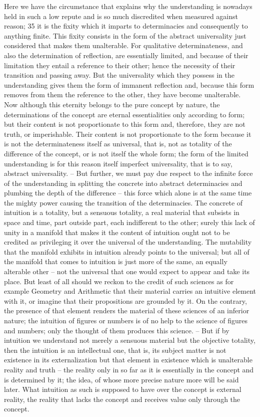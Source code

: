 Here we have the circumstance that explains why the understanding
is nowadays held in such a low repute and is so much discredited when
measured against reason; 35 it is the fixity which it imparts to determinacies
and consequently to anything finite. This fixity consists in the form of
the abstract universality just considered that makes them unalterable. For
qualitative determinateness, and also the determination of reflection, are
essentially limited, and because of their limitation they entail a reference
to their other; hence the necessity of their transition and passing away. But
the universality which they possess in the understanding gives them the
form of immanent reflection and, because this form removes from them
the reference to the other, they have become unalterable. Now although
this eternity belongs to the pure concept by nature, the determinations
of the concept are eternal essentialities only according to form; but their
content is not proportionate to this form and, therefore, they are not truth,
or imperishable. Their content is not proportionate to the form because it
is not the determinateness itself as universal, that is, not as totality of the
difference of the concept, or is not itself the whole form; the form of the
limited understanding is for this reason itself imperfect universality, that is
to say, abstract universality. – But further, we must pay due respect to the
infinite force of the understanding in splitting the concrete into abstract
determinacies and plumbing the depth of the difference – this force which
alone is at the same time the mighty power causing the transition of
the determinacies. The concrete of intuition is a totality, but a sensuous
totality, a real material that subsists in space and time, part outside part,
each indifferent to the other; surely this lack of unity in a manifold that
makes it the content of intuition ought not to be credited as privileging it
over the universal of the understanding. The mutability that the manifold
exhibits in intuition already points to the universal; but all of the manifold
that comes to intuition is just more of the same, an equally alterable other –
not the universal that one would expect to appear and take its place. But
least of all should we reckon to the credit of such sciences as for example
Geometry and Arithmetic that their material carries an intuitive element
with it, or imagine that their propositions are grounded by it. On the
contrary, the presence of that element renders the material of these sciences
of an inferior nature; the intuition of figures or numbers is of no help to
the science of figures and numbers; only the thought of them produces this
science. – But if by intuition we understand not merely a sensuous material
but the objective totality, then the intuition is an intellectual one, that is,
its subject matter is not existence in its externalization but that element
in existence which is unalterable reality and truth – the reality only in so
far as it is essentially in the concept and is determined by it; the idea, of
whose more precise nature more will be said later. What intuition as such
is supposed to have over the concept is external reality, the reality that lacks
the concept and receives value only through the concept.


